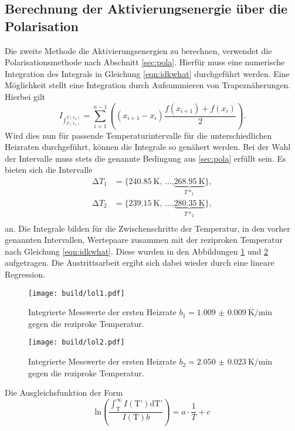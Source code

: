 \subsection{Berechnung der Aktivierungsenergie über die Polarisation}
Die zweite Methode die Aktivierungsenergien zu berechnen, verwendet die Polarisationsmethode nach Abschnitt \ref{sec:pola}. Hierfür muss eine numerische 
Integration des Integrals in Gleichung \eqref{eqn:idkwhat} durchgeführt werden. Eine Möglichkeit stellt eine Integration durch
Aufsummieren von Trapeznäherungen. Hierbei gilt 
\begin{equation}
I_{\int_{T(x_1)}^{T(x_n)}} = \sum_{i=1}^{n-1} \left( (x_{i+1} - x_{i}) \frac{f(x_{i+1}) + f(x_{i})}{2}\right).
\end{equation}
Wird dies nun für passende Temperaturintervalle für die unterschiedlichen Heizraten durchgeführt, können die Integrale so genähert werden.
Bei der Wahl der Intervalle muss stets die genannte Bedingung aus \ref{sec:pola} erfüllt sein. Es bieten sich die Intervalle
\begin{align*}
\increment T_1 &= \{\SI{240.85}{\kelvin}\text{, ...,} \underbrace{\SI{268.95}{\kelvin}}_{T*_1}\}, \\
\increment T_2 &= \{\SI{239.15}{\kelvin}\text{, ...,} \underbrace{\SI{280.35}{\kelvin}}_{T*_2}\}, \\
\end{align*}
an. Die Integrale bilden für die Zwischenschritte der Temperatur, in den vorher genannten Intervallen, Wertepaare zusammen mit der reziproken Temperatur nach 
Gleichung \eqref{eqn:idkwhat}. Diese wurden in den Abbildungen \ref{fig:lol1} und \ref{fig:lol2} aufgetragen. Die Austrittsarbeit ergibt sich dabei wieder durch eine lineare 
Regression.
\begin{figure}
    \centering
    \texttt{[image: build/lol1.pdf]}
    \caption{Integrierte Messwerte der ersten Heizrate \newline $b_1 = \SI{1.009(9)}{\kelvin\per\minute}$ gegen die reziproke Temperatur.
            }
    \label{fig:lol1}
\end{figure}
\begin{figure}
    \centering
    \texttt{[image: build/lol2.pdf]}
    \caption{Integrierte Messwerte der ersten Heizrate \newline $b_2 = \SI{2.050(23)}{\kelvin\per\minute}$ gegen die reziproke Temperatur.
            }
    \label{fig:lol2}
\end{figure}
Die Ausgleichsfunktion der Form
\begin{equation}
\text{ln} \left( \frac{\int_{\text{T}}^{\infty} I(\text{T'}) \text{dT'} }{I(\text{T})b}\right) = a \cdot \frac{1}{T} + c
\end{equation}
